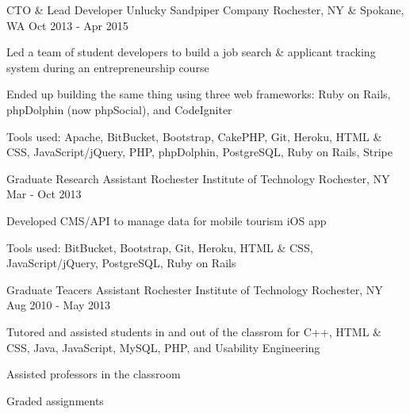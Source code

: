 \begin{cventries}
  \cventry
    {CTO \& Lead Developer} %
    {Unlucky Sandpiper Company} %
    {Rochester, NY \& Spokane, WA} %
    {Oct 2013 - Apr 2015} %
    {
      \begin{cvitems} %
        \item {Led a team of student developers to build a job search \& applicant tracking system during an entrepreneurship course}
        \item {Ended up building the same thing using three web frameworks: Ruby on Rails, phpDolphin (now phpSocial), and CodeIgniter}
        \item {Tools used: Apache, BitBucket, Bootstrap, CakePHP, Git, Heroku, HTML \& CSS, JavaScript/jQuery, PHP, phpDolphin, PostgreSQL, Ruby on Rails, Stripe}
      \end{cvitems}
    }

  \cventry
    {Graduate Research Assistant} %
    {Rochester Institute of Technology} %
    {Rochester, NY} %
    {Mar - Oct 2013} %
    {
      \begin{cvitems} %
        \item {Developed CMS/API to manage data for mobile tourism iOS app}
        \item {Tools used: BitBucket, Bootstrap, Git, Heroku, HTML \& CSS, JavaScript/jQuery, PostgreSQL, Ruby on Rails}
      \end{cvitems}
    }

  \cventry
    {Graduate Teacers Assistant}
    {Rochester Institute of Technology}
    {Rochester, NY}
    {Aug 2010 - May 2013}
    {
      \begin{cvitems}
        \item {Tutored and assisted students in and out of the classrom for C++, HTML \& CSS, Java, JavaScript, MySQL, PHP, and Usability Engineering}
        \item {Assisted professors in the classroom}
        \item {Graded assignments}
     \end{cvitems}
   }


\end{cventries}
